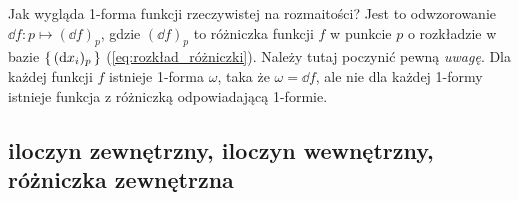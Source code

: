 \documentclass{article}
\begin{document}
Jak wygląda 1-forma funkcji rzeczywistej na rozmaitości? Jest to odwzorowanie $\dd{f}: p\mapsto (\dd{f})_p$, gdzie $(\dd{f})_p$ to różniczka funkcji $f$ w punkcie $p$ o rozkładzie w bazie $\set{(\dd{x_i})_p}$ (\ref{eq:rozkład_różniczki}). Należy tutaj poczynić pewną \textit{uwagę}. Dla każdej funkcji $f$ istnieje 1-forma $\omega$, taka że $\omega=\dd{f}$, ale nie dla każdej 1-formy istnieje funkcja z różniczką odpowiadającą 1-formie. 






\subsection{iloczyn zewnętrzny, iloczyn wewnętrzny, różniczka zewnętrzna}
\end{document}
